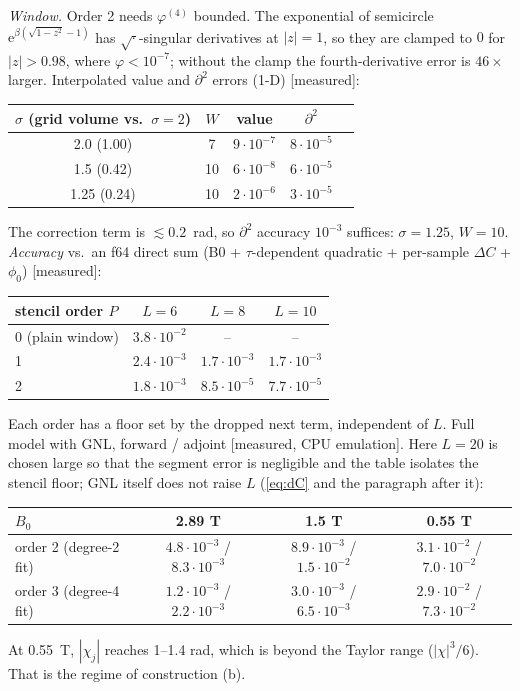 \documentclass[11pt]{article}
\theoremstyle{remark}
\newcommand{\ee}{\mathrm e}
\begin{document}
\emph{Window.} Order 2 needs $\varphi^{(4)}$ bounded. The exponential of semicircle $\ee^{\beta(\sqrt{1-z^2}-1)}$ has $\sqrt{\cdot}$-singular derivatives at $|z|=1$, so they are clamped to $0$ for $|z|>0.98$, where $\varphi<10^{-7}$; without the clamp the fourth-derivative error is $46\times$ larger. Interpolated value and $\partial^2$ errors (1-D) [measured]:
\begin{center}
\begin{tabular}{ccccc}
\toprule
$\sigma$ (grid volume vs.\ $\sigma{=}2$) & $W$ & value & $\partial^2$\\
\midrule
2.0 (1.00) & 7 & $9\cdot10^{-7}$ & $8\cdot10^{-5}$\\
1.5 (0.42) & 10 & $6\cdot10^{-8}$ & $6\cdot10^{-5}$\\
1.25 (0.24) & 10 & $2\cdot10^{-6}$ & $3\cdot10^{-5}$\\
\bottomrule
\end{tabular}
\end{center}
The correction term is $\lesssim0.2$~rad, so $\partial^2$ accuracy $10^{-3}$ suffices: $\sigma=1.25$, $W=10$.
\emph{Accuracy} vs.\ an f64 direct sum (B0 + $\tau$-dependent quadratic + per-sample $\Delta C$ + $\phi_0$) [measured]:
\begin{center}
\begin{tabular}{lccc}
\toprule
stencil order $P$ & $L=6$ & $L=8$ & $L=10$\\
\midrule
0 (plain window) & $3.8\cdot10^{-2}$ & -- & --\\
1 & $2.4\cdot10^{-3}$ & $1.7\cdot10^{-3}$ & $1.7\cdot10^{-3}$\\
2 & $1.8\cdot10^{-3}$ & $8.5\cdot10^{-5}$ & $7.7\cdot10^{-5}$\\
\bottomrule
\end{tabular}
\end{center}
Each order has a floor set by the dropped next term, independent of $L$. Full model with GNL, forward / adjoint [measured, CPU emulation]. Here $L=20$ is chosen large so that the segment error is negligible and the table isolates the stencil floor; GNL itself does not raise $L$ (\cref{eq:dC} and the paragraph after it):
\begin{center}
\begin{tabular}{lccc}
\toprule
$B_0$ & 2.89 T & 1.5 T & 0.55 T\\
\midrule
order 2 (degree-2 fit) & $4.8\cdot10^{-3}$ / $8.3\cdot10^{-3}$ & $8.9\cdot10^{-3}$ / $1.5\cdot10^{-2}$ & $3.1\cdot10^{-2}$ / $7.0\cdot10^{-2}$\\
order 3 (degree-4 fit) & $1.2\cdot10^{-3}$ / $2.2\cdot10^{-3}$ & $3.0\cdot10^{-3}$ / $6.5\cdot10^{-3}$ & $2.9\cdot10^{-2}$ / $7.3\cdot10^{-2}$\\
\bottomrule
\end{tabular}
\end{center}
At 0.55~T, $|\chi_j|$ reaches 1--1.4 rad, which is beyond the Taylor range ($|\chi|^3/6$). That is the regime of construction (b).
\end{document}
